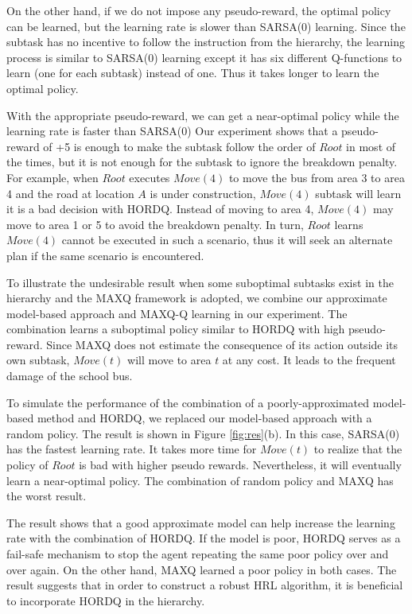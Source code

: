 On the other hand, if we do not impose any pseudo-reward, 
the optimal policy can be learned, but the learning rate is
slower than SARSA(0) learning. Since the subtask has no
incentive to follow the instruction from the hierarchy, 
the learning process is similar to SARSA(0) learning 
except it has six different Q-functions to learn (one for each subtask) instead of one.
Thus it takes longer to learn the optimal policy. 

With the appropriate pseudo-reward, we can get a near-optimal policy
while the learning rate is faster than SARSA(0)
Our experiment shows that a pseudo-reward of +5 is enough to make the subtask follow 
the order of $Root$ in most of the times, but it is not enough for the subtask to ignore
the breakdown penalty. For example, when $Root$ executes $Move(4)$ to move the bus from area 
3 to area 4 and the road at location $A$ is under construction, $Move(4)$ subtask
will learn it is a bad decision with HORDQ.
Instead of moving to area 4, $Move(4)$ may move to area 1 or 5 to avoid
the breakdown penalty. In turn, $Root$ learns $Move(4)$ cannot be executed in 
such a scenario, thus it will seek an alternate plan if the same scenario
is encountered.

To illustrate the undesirable result when some suboptimal subtasks exist in 
the hierarchy and the MAXQ framework is adopted, we combine our approximate model-based approach
and MAXQ-Q learning in our experiment. The combination learns a suboptimal policy similar to HORDQ with high pseudo-reward. 
Since MAXQ does not estimate the consequence of its action outside its own subtask,
$Move(t)$ will move to area $t$ at any cost. It leads to the frequent damage of the school bus.

To simulate the performance of the combination of a poorly-approximated model-based method and 
HORDQ, we replaced our model-based approach with a random policy.
The result is shown in Figure \ref{fig:res}(b). In this case, SARSA(0) has the fastest
learning rate. It takes more time for $Move(t)$ to realize that the policy of $Root$ is bad with higher pseudo rewards.
Nevertheless, it will eventually learn a near-optimal policy.
The combination of random policy and MAXQ has the worst result.

The result shows that a good approximate model 
can help increase the learning rate with the combination of HORDQ. 
If the model is poor, HORDQ serves as a fail-safe mechanism to stop 
the agent repeating the same poor policy over and over again.
On the other hand, MAXQ learned a poor policy in both cases.  
The result suggests that in order to construct a robust HRL 
algorithm, it is beneficial to incorporate HORDQ in the hierarchy.

